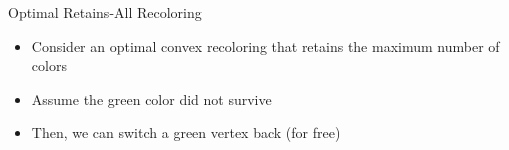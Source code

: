 \begin{frame}{Optimal Retains-All Recoloring}

\begin{itemize}
\item 
Consider an optimal convex recoloring that retains the maximum number of colors 

\item  
Assume the green color did not survive

\item
Then, we can switch a green vertex back (for free)  
\end{itemize}



\end{frame}